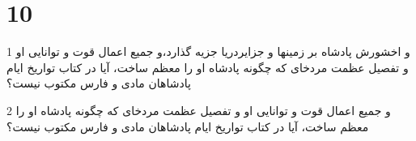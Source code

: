 \chapter{10}

\par 1 و اخشورش پادشاه بر زمینها و جزایردریا جزیه گذارد،و جمیع اعمال قوت و توانایی او و تفصیل عظمت مردخای که چگونه پادشاه او را معظم ساخت، آیا در کتاب تواریخ ایام پادشاهان مادی و فارس مکتوب نیست؟
\par 2 و جمیع اعمال قوت و توانایی او و تفصیل عظمت مردخای که چگونه پادشاه او را معظم ساخت، آیا در کتاب تواریخ ایام پادشاهان مادی و فارس مکتوب نیست؟


